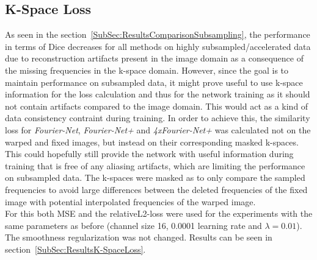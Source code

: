 \documentclass[english,version-2022-01]{uzl-thesis} %
\begin{document}
\subsection{K-Space Loss} \label{SubSec:K-SpaceLoss}
As seen in the section~\ref{SubSec:ResultsComparisonSubsampling}, the performance in terms of Dice decreases for all methods on highly subsampled/accelerated data due to reconstruction artifacts present in the image domain as a consequence of the missing frequencies in the k-space domain. However, since the goal is to maintain performance on subsampled data, it might prove useful to use k-space information for the loss calculation and thus for the network training as it should not contain artifacts compared to the image domain. This would act as a kind of data consistency contraint during training. In order to achieve this, the similarity loss for \emph{Fourier-Net}, \emph{Fourier-Net+} and \emph{4xFourier-Net+} was calculated not on the warped and fixed images, but instead on their corresponding masked k-spaces. This could hopefully still provide the network with useful information during training that is free of any aliasing artifacts, which are limiting the performance on subsampled data. The k-spaces were masked as to only compare the sampled frequencies to avoid large differences between the deleted frequencies of the fixed image with potential interpolated frequencies of the warped image. \\
For this both MSE and the relativeL2-loss were used for the experiments with the same parameters as before (channel size 16, 0.0001 learning rate and $\lambda = 0.01$). The smoothness regularization was not changed. Results can be seen in section~\ref{SubSec:ResultsK-SpaceLoss}.

\end{document}
